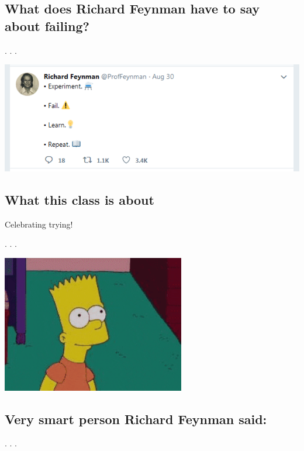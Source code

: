 \documentclass[
  letterpaper,
  DIV=11,
  numbers=noendperiod,
  oneside]{scrartcl}
\begin{document}
\hypertarget{what-does-richard-feynman-have-to-say-about-failing}{%
\subsection{What does Richard Feynman have to say about
failing?}\label{what-does-richard-feynman-have-to-say-about-failing}}

. . .

\includegraphics{./images/feynman_fail.png}

\hypertarget{what-this-class-is-about-2}{%
\subsection{What this class is about}\label{what-this-class-is-about-2}}

Celebrating trying!

. . .

\includegraphics[width=0.6\textwidth,height=\textheight]{w1_intro_files/mediabag/giphy.gif-cid=ecf05e123.gif}

\hypertarget{very-smart-person-richard-feynman-said}{%
\subsection{Very smart person Richard Feynman
said:}\label{very-smart-person-richard-feynman-said}}

. . .
\end{document}

